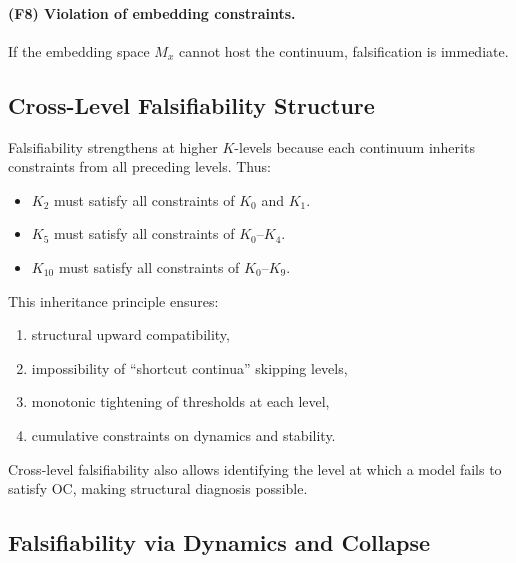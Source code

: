 \paragraph{(F8) Violation of embedding constraints.}  
If the embedding space $M_x$ cannot host the continuum, falsification
is immediate.



\subsection{Cross-Level Falsifiability Structure}

Falsifiability strengthens at higher $K$-levels because each continuum
inherits constraints from all preceding levels.
Thus:

\begin{itemize}
    \item $K_2$ must satisfy all constraints of $K_0$ and $K_1$.
    \item $K_5$ must satisfy all constraints of $K_0$–$K_4$.
    \item $K_{10}$ must satisfy all constraints of $K_0$–$K_9$.
\end{itemize}

This inheritance principle ensures:

\begin{enumerate}
    \item structural upward compatibility,
    \item impossibility of “shortcut continua” skipping levels,
    \item monotonic tightening of thresholds at each level,
    \item cumulative constraints on dynamics and stability.
\end{enumerate}

Cross-level falsifiability also allows identifying the level at which a
model fails to satisfy OC, making structural diagnosis possible.



\subsection{Falsifiability via Dynamics and Collapse}

